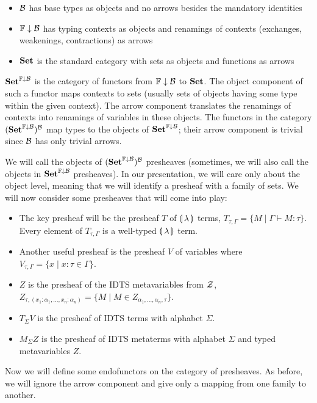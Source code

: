 \begin{itemize}
\item $\mathcal{B}$ has base types as objects and no arrows besides the mandatory
  identities
\item ${\mathbb{F}\downarrow\mathcal{B}}$ has typing contexts as objects and renamings of contexts
  (exchanges, weakenings, contractions) as arrows
\item $\mathbf{Set}$ is the standard category with sets as objects and functions
  as arrows
\end{itemize}

$\mathbf{Set}^{\mathbb{F}\downarrow\mathcal{B}}$ is the category of functors from ${\mathbb{F}\downarrow\mathcal{B}}$ to
$\mathbf{Set}$. The object component of such a functor maps contexts to sets
(usually sets of objects having some type within the given context). The
arrow component translates the renamings of contexts into renamings of
variables in these objects. The functors in the category
$(\mathbf{Set}^{\mathbb{F}\downarrow\mathcal{B}})^{\mathcal{B}}$ map types to the objects of $\mathbf{Set}^{\mathbb{F}\downarrow\mathcal{B}}$;
their arrow component is trivial since $\mathcal{B}$ has only trivial arrows.

We will call the objects of $(\mathbf{Set}^{\mathbb{F}\downarrow\mathcal{B}})^{\mathcal{B}}$ presheaves (sometimes,
we will also call the objects in $\mathbf{Set}^{\mathbb{F}\downarrow\mathcal{B}}$ presheaves). In our
presentation, we will care only about the object level, meaning that we
will identify a presheaf with a family of sets. We will now consider some
presheaves that will come into play:

\begin{itemize}
\item The key presheaf will be the presheaf $T$ of $\llparenthesis \, \lambda \, \rrparenthesis$
  terms, $T_{\tau,\Gamma} = \{ M \mid \Gamma \vdash M : \tau \}$. Every
  element of $T_{\tau,\Gamma}$ is a well-typed $\llparenthesis \, \lambda \, \rrparenthesis$ term.
\item Another useful presheaf is the presheaf $V$ of variables where
  $V_{\tau,\Gamma} = \{x \mid x : \tau \in \Gamma \}$.
\item $Z$ is the presheaf of the IDTS metavariables from $\mathcal{Z}$,
  $Z_{\tau, (x_1 : \alpha_1,\ldots,x_n : \alpha_n)} = \{ M \mid M \in
  Z_{\alpha_1,\ldots,\alpha_n,\tau} \}$.
\item $T_\Sigma V$ is the presheaf of IDTS terms with alphabet $\Sigma$.
\item $M_\Sigma
  Z$ is the presheaf of IDTS metaterms with alphabet
  $\Sigma$ and typed metavariables $Z$.
\end{itemize}

Now we will define some endofunctors on the category of presheaves. As
before, we will ignore the arrow component and give only a mapping from one
family to another.

